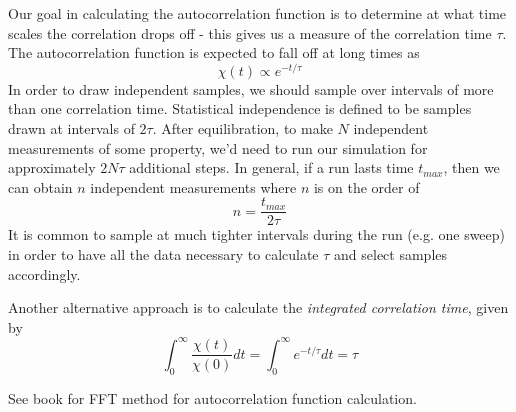 \documentclass{article}
\begin{document}
Our goal in calculating the autocorrelation function is to determine at what time scales the correlation drops off -
this gives us a measure of the correlation time $\tau$. The autocorrelation function is expected to fall off
at long times as
$$\chi(t) \propto e^{-t/\tau}$$
In order to draw independent samples, we should sample over intervals of more than one correlation time. Statistical
independence is defined to be samples drawn at intervals of $2\tau$. After equilibration, to make $N$ independent
measurements of some property, we'd need to run our simulation for approximately $2N\tau$ additional steps. In
general, if a run lasts time $t_{max}$, then we can obtain $n$ independent measurements where
$n$ is on the order of
$$n = \frac{t_{max}}{2\tau}$$
It is common to sample at much tighter intervals during the run (e.g. one sweep) in order to have all the data necessary to
calculate $\tau$ and select samples accordingly.

Another alternative approach is to calculate the \emph{integrated correlation time}, given by
$$\int_{0}^{\infty} \frac{\chi(t)}{\chi(0)}dt = \int_{0}^{\infty}e^{-t/\tau}dt = \tau$$

See book for FFT method for autocorrelation function calculation.
\end{document}

